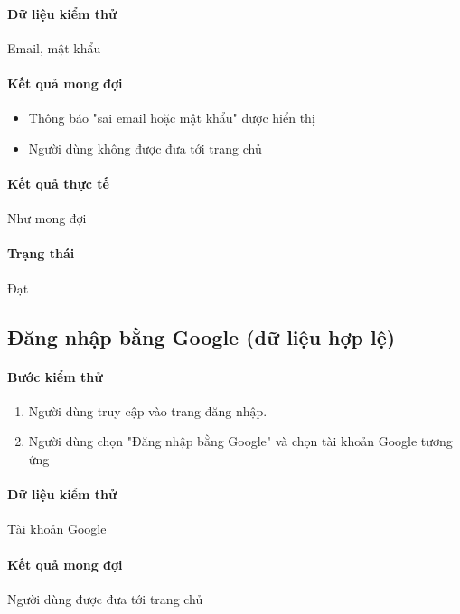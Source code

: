 \documentclass[./../main.tex]{subfiles}
\begin{document}
\paragraph*{Dữ liệu kiểm thử} Email, mật khẩu

\paragraph*{Kết quả mong đợi}

\begin{itemize}
    \item Thông báo "sai email hoặc mật khẩu" được hiển thị
    \item Người dùng không được đưa tới trang chủ
\end{itemize}

\paragraph*{Kết quả thực tế} Như mong đợi

\paragraph*{Trạng thái} Đạt

\subsection{Đăng nhập bằng Google (dữ liệu hợp lệ)}

\paragraph*{Bước kiểm thử}

\begin{enumerate}
    \item Người dùng truy cập vào trang đăng nhập.
    \item Người dùng chọn "Đăng nhập bằng Google" và chọn tài khoản Google tương ứng
\end{enumerate}

\paragraph*{Dữ liệu kiểm thử} Tài khoản Google

\paragraph*{Kết quả mong đợi} Người dùng được đưa tới trang chủ
\end{document}
